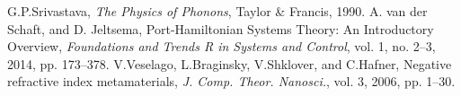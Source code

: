 \documentclass[letterpaper, 10pt, conference]{ieeeconf}  %
\begin{document}
\begin{thebibliography}{99}
%

%
G.P.Srivastava, \emph{The Physics of Phonons}, Taylor \& Francis, 1990.
A. van der Schaft, and D. Jeltsema,  Port-Hamiltonian Systems Theory: An Introductory
Overview, \emph{ Foundations and Trends
R in Systems and Control}, vol. 1, no. 2--3, 2014,  pp. 173--378.
V.Veselago, L.Braginsky, V.Shklover, and C.Hafner,
Negative refractive index metamaterials,
\emph{J. Comp. Theor. Nanosci.}, vol. 3, 2006, pp. 1--30.


\end{thebibliography}
\end{document}
